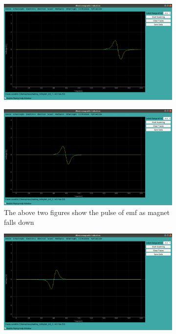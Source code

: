 \documentclass[%
 aip,
 amsmath,amssymb,
 reprint, floatfix%
]{revtex4-1}
\begin{document}
    \begin{figure}
        \centering
        \begin{subfigure}[b]{0.5\textwidth}
            \centering
            \includegraphics[scale = 0.19]{Figures/em_ind_1.png}
        \end{subfigure}
        \hfill
        \begin{subfigure}[b]{0.5\textwidth}
            \centering
            \includegraphics[scale = 0.19]{Figures/em_ind_2.png}
            \caption{The above two figures show the pulse of emf as magnet falls down}
            \label{fig:em2}
        \end{subfigure}
        \hfill
        \begin{subfigure}[b]{0.5\textwidth}
            \centering
            \includegraphics[scale = 0.19]{Figures/em_ind_3.png}

\end{subfigure}
\end{figure}
\end{document}

